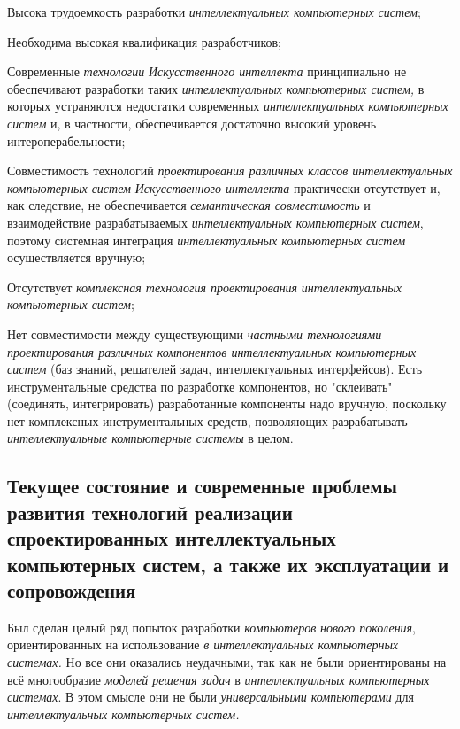 \begin{textitemize}
	\item
	Высока трудоемкость разработки \textit{интеллектуальных компьютерных систем};
	\item
	Необходима высокая квалификация разработчиков;
	\item
	Современные \textit{технологии} \textit{Искусственного интеллекта} принципиально не обеспечивают разработки таких \textit{интеллектуальных компьютерных систем,} в которых устраняются недостатки современных \textit{интеллектуальных компьютерных систем} и, в частности, обеспечивается достаточно высокий уровень интероперабельности;
	\item
	Совместимость технологий \textit{проектирования различных классов интеллектуальных компьютерных систем} \textit{Искусственного интеллекта} практически отсутствует и, как следствие, не обеспечивается \textit{семантическая совместимость} и взаимодействие разрабатываемых \textit{интеллектуальных компьютерных систем}, поэтому системная интеграция \textit{интеллектуальных компьютерных систем} осуществляется вручную;
	\item
	Отсутствует \textit{комплексная технология проектирования} \textit{интеллектуальных компьютерных систем};
	\item
	Нет совместимости между существующими \textit{частными технологиями проектирования различных компонентов интеллектуальных компьютерных систем} (баз знаний, решателей задач, интеллектуальных интерфейсов). Есть инструментальные средства по разработке компонентов, но "склеивать" (соединять, интегрировать) разработанные компоненты надо вручную, поскольку нет комплексных инструментальных средств, позволяющих разрабатывать \textit{интеллектуальные компьютерные системы} в целом.
\end{textitemize}

\subsection{Текущее состояние и современные проблемы развития технологий реализации спроектированных интеллектуальных компьютерных систем, а также их эксплуатации и сопровождения}
\label{subsec_current_state_and_modern_problems_development_technologies_implementation_designed_ICS}

Был сделан целый ряд попыток разработки \textit{компьютеров} \textit{нового поколения}, ориентированных на использование \textit{в интеллектуальных компьютерных системах.} Но все они оказались неудачными, так как не были ориентированы на всё многообразие \textit{моделей решения задач} в \textit{интеллектуальных компьютерных системах}. В этом смысле они не были \textit{универсальными компьютерами} для \textit{интеллектуальных компьютерных систем.}

